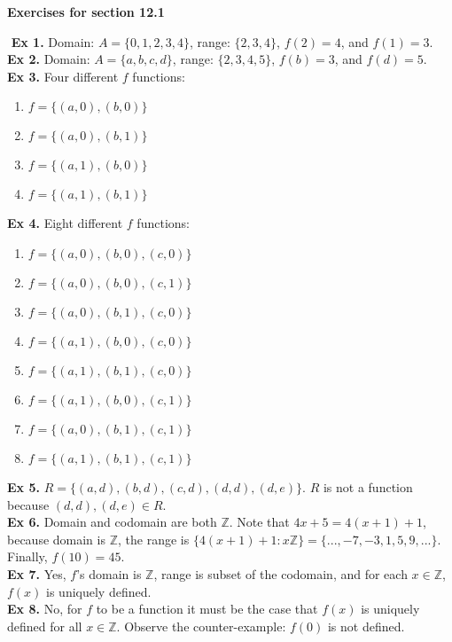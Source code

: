 \documentclass{article}
\date{}
\author{}
\begin{document}
\centerline{\textbf{Exercises for section 12.1}}
$ $\newline
\textbf{Ex 1.} Domain: $A=\{0,1,2,3,4\}$, range: $\{2,3,4\}$, $f(2)=4$, and $f(1)=3$.\\

\noindent\textbf{Ex 2.} Domain: $A=\{a,b,c,d\}$, range: $\{2,3,4,5\}$, $f(b)=3$, and $f(d)=5$.\\

\noindent\textbf{Ex 3.} Four different $f$ functions:
\begin{enumerate}
\item $f = \{(a,0), (b, 0)\}$
\item $f = \{(a,0), (b, 1)\}$
\item $f = \{(a,1), (b, 0)\}$
\item $f = \{(a,1), (b, 1)\}$
\end{enumerate}

\noindent\textbf{Ex 4.} Eight different $f$ functions:
\begin{enumerate}
\item $f = \{(a,0), (b,0), (c,0)\}$
\item $f = \{(a,0), (b,0), (c,1)\}$
\item $f = \{(a,0), (b,1), (c,0)\}$
\item $f = \{(a,1), (b,0), (c,0)\}$
\item $f = \{(a,1), (b,1), (c,0)\}$
\item $f = \{(a,1), (b,0), (c,1)\}$
\item $f = \{(a,0), (b,1), (c,1)\}$
\item $f = \{(a,1), (b,1), (c,1)\}$
\end{enumerate}

\noindent\textbf{Ex 5.} $R = \{(a,d), (b,d),(c,d), (d,d), (d,e)\}$. $R$ is not a function because $(d,d), (d,e) \in R$.\\

\noindent\textbf{Ex 6.} Domain and codomain are both $\mathbb{Z}$. Note that $4x+5=4(x+1)+1$, because domain is $\mathbb{Z}$, the range is $\{4(x+1)+1 : x \mathbb{Z} \} = \{ ...,-7,-3,1,5,9,... \}$. Finally, $f(10)=45$.\\

\noindent\textbf{Ex 7.} Yes, $f$'s domain is $\mathbb{Z}$, range is subset of the codomain, and for each $x \in \mathbb{Z}$, $f(x)$ is uniquely defined.\\

\noindent\textbf{Ex 8.} No, for $f$ to be a function it must be the case that $f(x)$ is uniquely defined for all $x \in \mathbb{Z}$. Observe the counter-example: $f(0)$ is not defined.\\
\end{document}

